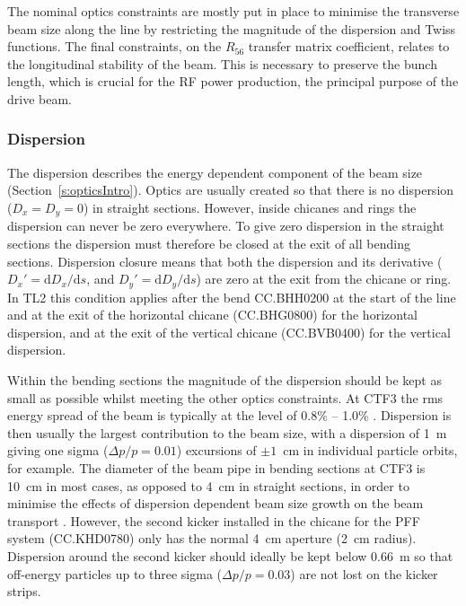 The nominal optics constraints are mostly put in place to minimise the transverse beam size along the line by restricting the magnitude of the dispersion and Twiss functions. The final constraints, on the \(R_{56}\) transfer matrix coefficient, relates to the longitudinal stability of the beam. This is necessary to preserve the bunch length, which is crucial for the RF power production, the principal purpose of the drive beam.

\subsubsection{Dispersion}

The dispersion describes the energy dependent component of the beam size (Section~\ref{s:opticsIntro}). Optics are usually created so that there is no dispersion (\(D_{x} = D_{y} = 0\)) in straight sections. However, inside chicanes and rings the dispersion can never be zero everywhere. To give zero dispersion in the straight sections the dispersion must therefore be closed at the exit of all bending sections. Dispersion closure means that both the dispersion and its derivative (\(D_x' = \mathrm{d}D_x/\mathrm{d}s\), and \(D_y' = \mathrm{d}D_y/\mathrm{d}s\)) are zero at the exit from the chicane or ring. In TL2 this condition applies after the bend CC.BHH0200 at the start of the line and at the exit of the horizontal chicane (CC.BHG0800) for the horizontal dispersion, and at the exit of the vertical chicane (CC.BVB0400) for the vertical dispersion.

Within the bending sections the magnitude of the dispersion should be kept as small as possible whilst meeting the other optics constraints. At CTF3 the rms energy spread of the beam is typically at the  level of 0.8\% -- 1.0\% \cite{CTF3}. Dispersion is then usually the largest contribution to the beam size, with a dispersion of 1~m giving one sigma (\(\Delta p/p=0.01\)) excursions of \(\pm1\)~cm in individual particle orbits, for example. The diameter of the beam pipe in bending sections at CTF3 is 10~cm in most cases, as opposed to 4~cm in straight sections, in order to minimise the effects of dispersion dependent beam size growth on the beam transport \cite{CTF3}. However, the second kicker installed in the chicane for the PFF system (CC.KHD0780) only has the normal 4~cm aperture (2~cm radius).  Dispersion around the second kicker should ideally be kept below 0.66~m so that off-energy particles up to three sigma (\(\Delta p/p=0.03\)) are not lost on the kicker strips.

